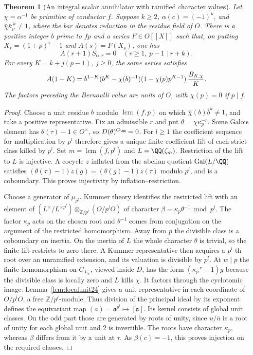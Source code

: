 \documentclass[a4paper,11pt]{article}
\newtheorem{theorem}[proposition]{Theorem}
\theoremstyle{definition}
\theoremstyle{remark}
\newcommand{\ZZ}{\mathbb Z}\newcommand{\ord}{\operatorname{ord}}
\numberwithin{equation}{section}
\begin{document}
\begin{theorem}[An integral scalar annihilator with ramified character values]
\label{thm:scalar231}
Let \(\chi=\alpha^{-1}\) be primitive of conductor \(f\). Suppose
\(k\ge2\), \(\alpha(c)=(-1)^k\), and
\(\bar\chi\bar\kappa_p^{\,k}\ne1\), where the bar denotes reduction
in the residue field of \(O\). There is a positive integer \(b\)
prime to \(fp\) and a series \(F\in O[[X]]\) such that, on putting
\(X_s=(1+p)^s-1\) and \(A(s)=F(X_s)\), one has
\[
 A(r+1)S_{\alpha,r}=0
       \quad(r\ge1,\ p-1\mid r+k).
\]
For every \(K=k+j(p-1)\), \(j\ge0\), the same series satisfies
\[
 A(1-K)=b^{1-K}(b^K-\chi(b)^{-1})
           (1-\chi(p)p^{K-1})\,{B_{K,\chi}\over K}.
\]
The factors preceding the Bernoulli value are units of \(O\),
with \(\chi(p)=0\) if \(p\mid f\).
\end{theorem}
\begin{proof}
Choose a unit residue \(b\) modulo \(\operatorname{lcm}(f,p)\)
on which \(\bar\chi(b)\bar b^k\ne1\), and take a positive
representative. Fix an admissible \(r\) and put
\(\theta=\chi\kappa_p^{-r}\). Some Galois element has
\(\theta(\tau)-1\in O^\times\), so \(D(\theta)^{G_\QQ}=0\).
For \(l\ge1\) the coefficient sequence for multiplication by \(p^l\)
therefore gives a unique finite-coefficient lift of each strict
class killed by \(p^l\). Set \(m=\operatorname{lcm}(f,p^l)\)
and \(L=\QQ(\zeta_m)\). Restriction of the lift to \(L\) is
injective. A cocycle \(z\) inflated from the abelian quotient
\(\operatorname{Gal}(L/\QQ)\) satisfies
\((\theta(\tau)-1)z(g)=(\theta(g)-1)z(\tau)\) modulo \(p^l\),
and is a coboundary. This proves injectivity by inflation--restriction.

Choose a generator of \(\mu_{p^l}\). Kummer theory identifies the
restricted lift with an element of
\((L^\times/L^{\times p^l})\otimes_{\ZZ/p^l}(O/p^lO)\)
of character \(\beta=\kappa_p\theta^{-1}\bmod p^l\). The factor
\(\kappa_p\) acts on the chosen root and \(\theta^{-1}\) comes from
conjugation on the argument of the restricted homomorphism.
Away from \(p\) the divisible class is a coboundary on inertia.
On the inertia of \(L\) the whole character \(\theta\) is trivial,
so the finite lift restricts to zero there. A Kummer representative
then acquires a \(p^l\)-th root over an unramified extension,
and its valuation is divisible by \(p^l\). At \(w\mid p\) the
finite homomorphism on \(G_{L_w}\), viewed inside \(D\), has the
form \((\kappa_p^{-r}-1)y\) because the divisible class is locally
zero and \(L\) kills \(\chi\). It factors through the cyclotomic
image. Lemma~\ref{lem:localunit24} gives a unit representative in
each coordinate of \(O/p^lO\), a free \(\ZZ/p^l\)-module.
Thus division of the principal ideal by its exponent defines the
equivariant map \((a)=\mathfrak a^{p^l}\mapsto[\mathfrak a]\).
Its kernel consists of global unit classes. On the odd part those
are generated by roots of unity, since \(u/\bar u\) is a root of
unity for each global unit and \(2\) is invertible. The roots have
character \(\kappa_p\), whereas \(\beta\) differs from it by a
unit at \(\tau\). As \(\beta(c)=-1\), this proves injection on the
required classes.


\end{proof}
\end{document}
